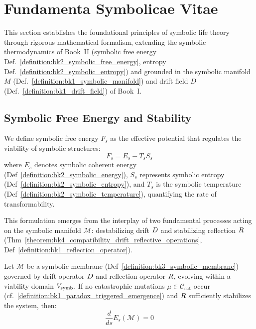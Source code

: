 \section{Fundamenta Symbolicae Vitae}
\label{sec:bk5_funadmenta_symbolicae_vitae}
This section establishes the foundational principles of symbolic life theory through rigorous mathematical formalism, extending the symbolic thermodynamics of Book~II (symbolic free energy Def.~\ref{definition:bk2_symbolic_free_energy}, entropy Def.~\ref{definition:bk2_symbolic_entropy}) and grounded in the symbolic manifold $M$ (Def.~\ref{definition:bk1_symbolic_manifold}) and drift field $D$ (Def.~\ref{definition:bk1_drift_field}) of Book~I.

\subsection{Symbolic Free Energy and Stability}
\label{subsec:bk5_symbolic_free_energy_and_stability}
We define symbolic free energy $F_s$ as the effective potential that regulates the viability of symbolic structures:
\begin{equation}
F_s = E_s - T_s S_s
\end{equation}
\noindent where $E_s$ denotes symbolic coherent energy (Def~\ref{definition:bk2_symbolic_energy}), 
$S_s$ represents symbolic entropy (Def~\ref{definition:bk2_symbolic_entropy}), 
and $T_s$ is the symbolic temperature (Def~\ref{definition:bk2_symbolic_temperature}), 
quantifying the rate of transformability.

This formulation emerges from the interplay of two fundamental processes acting on the symbolic manifold 
$\mathcal{M}$: destabilizing drift $D$ and stabilizing reflection $R$ 
(Thm~\ref{theorem:bk4_compatibility_drift_reflective_operations}, Def~\ref{definition:bk1_reflection_operator}).

\begin{theorem} 
\label{theorem:bk5_symbolic_coherence_conservation}
Let $\mathcal{M}$ be a symbolic membrane 
(Def~\ref{definition:bk3_symbolic_membrane}) governed by drift operator $D$ 
and reflection operator $R$, evolving within a viability domain $V_{\mathrm{symb}}$. 
If no catastrophic mutations $\mu \in \mathcal{C}_{\mathrm{cat}}$ occur (cf.~\ref{definition:bk1_paradox_triggered_emergence}) and
$R$ sufficiently stabilizes the system, then:
\begin{equation}
\frac{d}{ds} E_s(\mathcal{M}) = 0
\end{equation}
\end{theorem}

